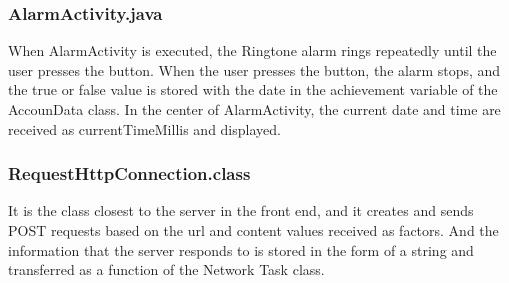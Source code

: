 \documentclass[conference]{IEEEtran}
\begin{document}
\subsubsection{AlarmActivity.java}
When AlarmActivity is executed, the Ringtone alarm rings repeatedly until the user presses the button. When the user presses the button, the alarm stops, and the true or false value is stored with the date in the achievement variable of the AccounData class. In the center of AlarmActivity, the current date and time are received as currentTimeMillis and displayed.
\break
\subsubsection{RequestHttpConnection.class}
It is the class closest to the server in the front end, and it creates and sends POST requests based on the url and content values received as factors. And the information that the server responds to is stored in the form of a string and transferred as a function of the Network Task class.\break
\end{document}
